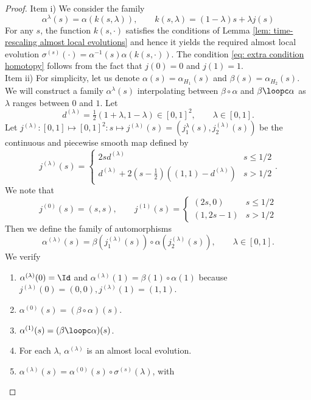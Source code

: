 \begin{proof}
	Item i)  We consider the family
	$$
	\alpha^{\lambda}(s) =      \alpha( k(s,\lambda)), \qquad   k(s,\lambda)=  (1-\lambda)s+ \lambda j(s)
	$$
	For any $s$, the function $k(s,\cdot)$ satisfies the conditions of Lemma \ref{lem: time-rescaling almost local evolutions} and hence it yields the required almost local evolution 
	$\sigma^{(s)}(\cdot)=\alpha^{-1}(s) \alpha(k(s,\cdot))$.
	The condition \eqref{eq: extra condition homotopy} follows from the fact that $j(0)=0$ and $j(1)=1$.\\
	Item ii)  For simplicity, let us denote $\alpha(s)=\alpha_{H_1}(s)$ and $\beta(s)=\alpha_{H_2}(s)$.
	We will construct a family $\alpha^\lambda(s)$ interpolating between $\beta\circ\alpha$ and $\beta \loopc \alpha$ as $\lambda$ ranges between $0$ and $1$. Let 
	$$
	d^{(\lambda)}=\tfrac{1}{2}(1+\lambda,1-\lambda) \in [0,1]^2,\qquad \lambda\in[0,1].
	$$
	Let $j^{(\lambda)}: [0,1] \mapsto [0,1]^2:  s \mapsto j^{(\lambda)}(s)=(j_1^{\lambda}(s),j_2^{(\lambda)}(s)) $ be the continuous and piecewise smooth map defined by 
	$$
	j^{(\lambda)}(s)=
	\begin{cases}
	2s d^{(\lambda)}  &   s\leq 1/2 \\
	d^{(\lambda)} + 2(s-\tfrac{1}{2})\left((1,1) - d^{(\lambda)} \right)  & s>1/2  
	\end{cases}.
	$$
	We note that
	\begin{equation}\label{eq: extreme values for j}
	j^{(0)}(s)=(s,s),\qquad    j^{(1)}(s)=
	\begin{cases}
	(2s,0)  &   s\leq 1/2 \\
	(1,2s-1)  & s>1/2  
	\end{cases}
	\end{equation}
	Then we define the family of automorphisms
	$$ 
	\alpha^{(\lambda)}(s)=   \beta(j_1^{(\lambda)}(s) ) \circ \alpha(j_2^{(\lambda)}(s) ) ,\qquad \lambda\in[0,1].
	$$
	We verify
	\begin{enumerate}
		\item $\alpha^{(\lambda)}(0)= \Id$ and $\alpha^{(\lambda)}(1)= \beta(1 ) \circ \alpha(1 )$ because $j^{(\lambda)}(0)=(0,0), j^{(\lambda)}(1)=(1,1)$.%
		\item $\alpha^{(0)}(s)=  (\beta\circ \alpha)(s )$. 
		\item $\alpha^{(1)}(s)=  (\beta \loopc \alpha)(s)$. 
		\item For each $\lambda$, $\alpha^{(\lambda)}$ is an almost local evolution.
		\item $\alpha^{(\lambda)}(s)=    \alpha^{(0)}(s) \circ \sigma^{(s)}(\lambda) $, with 

\end{enumerate}
\end{proof}
